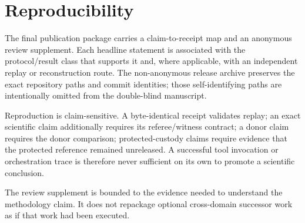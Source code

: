 \section{Reproducibility}

The final publication package carries a claim-to-receipt map and an anonymous review supplement. Each headline statement is associated with the protocol/result class that supports it and, where applicable, with an independent replay or reconstruction route. The non-anonymous release archive preserves the exact repository paths and commit identities; those self-identifying paths are intentionally omitted from the double-blind manuscript.

Reproduction is claim-sensitive. A byte-identical receipt validates replay; an exact scientific claim additionally requires its referee/witness contract; a donor claim requires the donor comparison; protected-custody claims require evidence that the protected reference remained unreleased. A successful tool invocation or orchestration trace is therefore never sufficient on its own to promote a scientific conclusion.

The review supplement is bounded to the evidence needed to understand the methodology claim. It does not repackage optional cross-domain successor work as if that work had been executed.